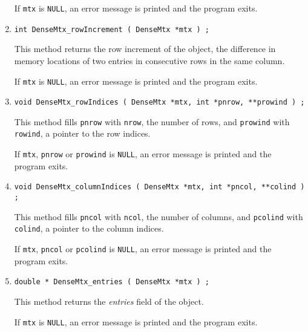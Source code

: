 \begin{enumerate}
If {\tt mtx} is {\tt NULL},
an error message is printed and the program exits.
\item
\begin{verbatim}
int DenseMtx_rowIncrement ( DenseMtx *mtx ) ;
\end{verbatim}
This method returns the row increment of the object, the difference
in memory locations of two entries in consecutive rows in the same
column.
\par {}
If {\tt mtx} is {\tt NULL},
an error message is printed and the program exits.
\item
\begin{verbatim}
void DenseMtx_rowIndices ( DenseMtx *mtx, int *pnrow, **prowind ) ;
\end{verbatim}
This method fills {\tt *pnrow} with {\tt nrow}, the number of rows,
and {\tt *prowind} with {\tt rowind},
a pointer to the row indices.
\par {}
If {\tt mtx}, {\tt pnrow} or {\tt prowind} is {\tt NULL},
an error message is printed and the program exits.
\item
\begin{verbatim}
void DenseMtx_columnIndices ( DenseMtx *mtx, int *pncol, **colind ) ;
\end{verbatim}
This method fills {\tt *pncol} with {\tt ncol}, the number of columns,
and {\tt *pcolind} with {\tt colind},
a pointer to the column indices.
\par {}
If {\tt mtx}, {\tt pncol} or {\tt pcolind} is {\tt NULL},
an error message is printed and the program exits.
\item
\begin{verbatim}
double * DenseMtx_entries ( DenseMtx *mtx ) ;
\end{verbatim}
This method returns the {\it entries} field of the object.
\par {}
If {\tt mtx} is {\tt NULL},
an error message is printed and the program exits.

\end{enumerate}
